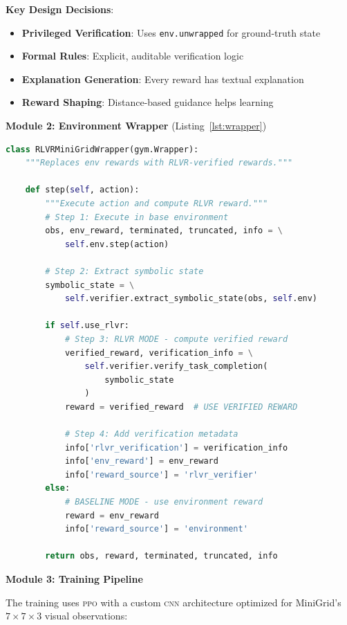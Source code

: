 \documentclass[11pt,a4paper]{article}
\newcommand{\ppo}{\textsc{ppo}}
\newcommand{\cnn}{\textsc{cnn}}
\begin{document}
\textbf{Key Design Decisions}:
\begin{itemize}[leftmargin=*]
    \item \textbf{Privileged Verification}: Uses \texttt{env.unwrapped} for ground-truth state
    \item \textbf{Formal Rules}: Explicit, auditable verification logic
    \item \textbf{Explanation Generation}: Every reward has textual explanation
    \item \textbf{Reward Shaping}: Distance-based guidance helps learning
\end{itemize}

\textbf{Module 2: Environment Wrapper} (Listing~\ref{lst:wrapper})

\begin{lstlisting}[caption={Environment integration from \texttt{rlvr\_env\_wrapper.py}}, label=lst:wrapper, language=Python]
class RLVRMiniGridWrapper(gym.Wrapper):
    """Replaces env rewards with RLVR-verified rewards."""
    
    def step(self, action):
        """Execute action and compute RLVR reward."""
        # Step 1: Execute in base environment
        obs, env_reward, terminated, truncated, info = \
            self.env.step(action)
        
        # Step 2: Extract symbolic state
        symbolic_state = \
            self.verifier.extract_symbolic_state(obs, self.env)
        
        if self.use_rlvr:
            # Step 3: RLVR MODE - compute verified reward
            verified_reward, verification_info = \
                self.verifier.verify_task_completion(
                    symbolic_state
                )
            reward = verified_reward  # USE VERIFIED REWARD
            
            # Step 4: Add verification metadata
            info['rlvr_verification'] = verification_info
            info['env_reward'] = env_reward
            info['reward_source'] = 'rlvr_verifier'
        else:
            # BASELINE MODE - use environment reward
            reward = env_reward
            info['reward_source'] = 'environment'
        
        return obs, reward, terminated, truncated, info
\end{lstlisting}

\textbf{Module 3: Training Pipeline}

The training uses \ppo{} with a custom \cnn{} architecture optimized for MiniGrid's $7 \times 7 \times 3$ visual observations:
\end{document}
